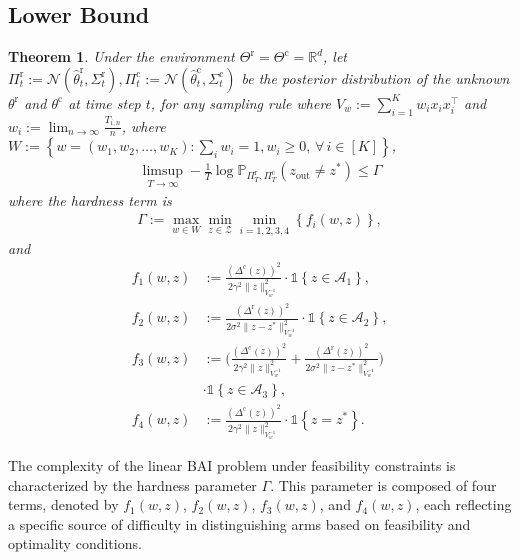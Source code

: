 \documentclass[accepted]{uai2025} %
\theoremstyle{plain}
\newtheorem{theorem}{Theorem}[section]
\theoremstyle{definition}
\theoremstyle{remark}
\newcommand{\thetac}{\theta^{\mathrm{c}}}
\newcommand{\Deltac}{\Delta^{\mathrm{c}}}
\newcommand{\Deltar}{\Delta^{\mathrm{r}}}
\newcommand{\thetar}{\theta^{\mathrm{r}}}
\newcommand{\PP}{\mathbb{P}} %
\newcommand{\cbr}[1]{\left\{#1\right\}}
\newcommand*{\one}{\mathds{1}}
\begin{document}
\vspace{-.1in}
\subsection{Lower Bound}\vspace{-.1in}
\begin{theorem} \label{Thm:lb1}
    Under the environment $\Theta^\mathrm{r}=\Theta^\mathrm{c}=\mathbb{R}^d$, let $\Pi^{\mathrm{r}}_t:=\mathcal{N}(\hat{\theta}_t^{\mathrm{r}}, \Sigma_t^{\mathrm{r}}), \Pi^{\mathrm{c}}_t:=\mathcal{N}(\hat{\theta}_t^{\mathrm{c}}, \Sigma_t^{\mathrm{c}})$ be the posterior distribution of the unknown $\thetar$ and $ \thetac$ at time step $t$, for any sampling rule where $V_w:=\sum_{i=1}^K w_{i} x_i x_i^{\top}$ and $w_i:=\lim_{n\rightarrow \infty}\frac{T_{i,n}}{n}$, where $W:=\cbr{w=(w_1, w_2, \ldots, w_K): \sum_i w_i=1, w_i\ge0, \, \forall \, i\in [K]}$, 
    \begin{align*}
        \limsup_{T\rightarrow\infty} -\frac{1}{T} \log \PP_{\Pi_T^{\mathrm{r}}, \Pi_T^{\mathrm{c}}}(z_{\text{out}}\neq z^*)\le\Gamma
    \end{align*}
    where  the hardness term is
    \begin{align*}
     \Gamma  := \max_{w\in W}\min_{z\in \mathcal{Z}} \min_{i=1,2,3,4} \cbr{f_i(w,z)   }, 
     \end{align*}
     and 
     \begin{align*}
     f_1(w,z) &:= \frac{(\Deltac(z))^2}{2\gamma^2\lVert z\rVert^2_{V_w^{-1}}} \cdot \one \cbr{z\in \mathcal{A}_1}, \\
    f_2(w,z) &:= \frac{(\Deltar(z))^2}{2\sigma^2\lVert z-z^* \rVert^2_{V_w^{-1}}} \cdot \one \cbr{z\in \mathcal{A}_2}, \\
    f_3(w,z) &:= \bigg( \frac{(\Deltac(z))^2}{2\gamma^2\lVert z\rVert^2_{V_w^{-1}}} + \frac{(\Deltar(z))^2}{2\sigma^2\lVert z-z^*\rVert^2_{V_w^{-1}}} \bigg) 
    \\&\cdot \one \cbr{z\in \mathcal{A}_3}, \\
    f_4(w,z) &:= \frac{(\Deltac(z))^2}{2\gamma^2\lVert z\rVert^2_{V_w^{-1}}} \cdot \one \cbr{z=z^*}.
\end{align*}
\end{theorem}
The complexity of the linear BAI problem under feasibility constraints is characterized by the hardness parameter $\Gamma$. This parameter is composed of four   terms, denoted by $f_1(w, z)$, $f_2(w, z)$, $f_3(w, z)$, and $f_4(w, z)$, each reflecting a specific source of difficulty in distinguishing arms based on feasibility and optimality conditions.
\end{document}
